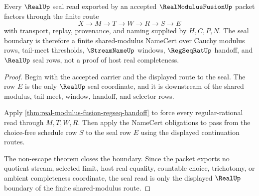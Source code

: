 \begin{theorem}
\label{thm:real-modulus-fusion-real-seal-boundary}
Every $\RealUp$ seal read exported by an accepted $\RealModulusFusionUp$ packet factors through the finite route
$$
X \longrightarrow M \longrightarrow T \longrightarrow W \longrightarrow R \longrightarrow S \longrightarrow E
$$
with transport, replay, provenance, and naming supplied by $H,C,P,N$. The seal boundary is therefore a finite shared-modulus NameCert over Cauchy modulus rows, tail-meet thresholds, $\StreamNameUp$ windows, $\RegSeqRatUp$ handoff, and $\RealUp$ seal rows, not a proof of host real completeness.
\end{theorem}
\begin{proof}
Begin with the accepted carrier and the displayed route to the seal. The row $E$ is the only $\RealUp$ seal coordinate, and it is downstream of the shared modulus, tail-meet, window, handoff, and selector rows.

Apply \autoref{thm:real-modulus-fusion-regseq-handoff} to force every regular-rational read through $M,T,W,R$. Then apply the NameCert obligations to pass from the choice-free schedule row $S$ to the seal row $E$ using the displayed continuation routes.

The non-escape theorem closes the boundary. Since the packet exports no quotient stream, selected limit, host real equality, countable choice, trichotomy, or ambient completeness coordinate, the seal read is only the displayed $\RealUp$ boundary of the finite shared-modulus route.
\end{proof}


